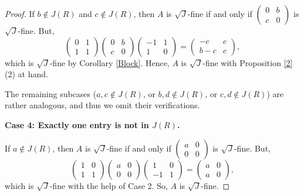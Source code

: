 \documentclass[10pt,a4paper]{amsart}
\begin{document}
\begin{proof}
If \( b \not\in J(R) \) and \( c \not\in J(R) \), then \( A \) is $\sqrt{J}$-fine if and only if \( \begin{pmatrix} 0 & b \\ c & 0 \end{pmatrix} \) is $\sqrt{J}$-fine. But,
	\[
	\begin{pmatrix} 0 & 1 \\ 1 & 1 \end{pmatrix} \begin{pmatrix} 0 & b \\ c & 0 \end{pmatrix} \begin{pmatrix} -1 & 1 \\ 1 & 0 \end{pmatrix}
	= \begin{pmatrix} -c & c \\ b-c & c \end{pmatrix},
	\]
which is $\sqrt{J}$-fine by Corollary \ref{Block}. Hence, \( A \) is $\sqrt{J}$-fine with Proposition \ref{2}(2) at hand.
	
The remaining subcases (\( a,c \not\in J(R) \), or \( b,d \not\in J(R) \), or \( c,d \not\in J(R) \)) are rather analogous, and thus we omit their verifications.

\medskip
	
\textbf{Case 4: Exactly one entry is not in \( J(R) \).}

\medskip
	
If \( a \not\in J(R) \), then \( A \) is $\sqrt{J}$-fine if and only if \( \begin{pmatrix} a & 0 \\ 0 & 0 \end{pmatrix} \) is $\sqrt{J}$-fine. But,
	\[
	\begin{pmatrix} 1 & 0 \\ 1 & 1 \end{pmatrix} \begin{pmatrix} a & 0 \\ 0 & 0 \end{pmatrix} \begin{pmatrix} 1 & 0 \\ -1 & 1 \end{pmatrix}
	= \begin{pmatrix} a & 0 \\ a & 0 \end{pmatrix},
	\]
which is $\sqrt{J}$-fine with the help of Case 2. So, \( A \) is $\sqrt{J}$-fine.
	

\end{proof}
\end{document}
